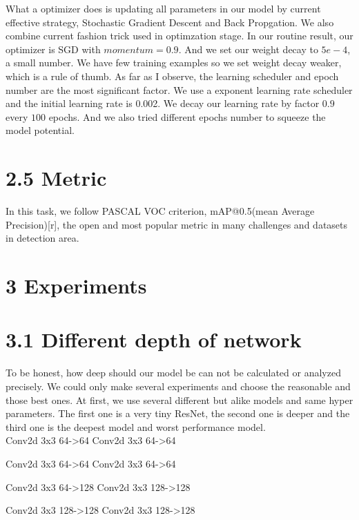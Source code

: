 \documentclass[12pt]{article}
\begin{document}
What a optimizer does is updating all parameters in our model by current effective strategy, Stochastic Gradient Descent and Back Propgation. We also combine current fashion trick used in optimzation stage. In our routine result, our optimizer is SGD with $momentum = 0.9$. And we set our weight decay to $5e-4$, a small number. We have few training examples so we set weight decay weaker, which is a rule of thumb. As far as I observe, the learning scheduler and epoch number are the most significant factor. We use a exponent learning rate scheduler and the initial learning rate is 0.002. We decay our learning rate by factor $0.9$ every $100$ epochs. And we also tried different epochs number to squeeze the model potential.\\


\section {2.5 Metric}

In this task, we follow PASCAL VOC criterion, mAP@0.5(mean Average Precision)[r], the open and most popular metric in many challenges and datasets in detection area. \\


\section {3 Experiments}

\section {3.1 Different depth of network}

To be honest, how deep should our model be can not be calculated or analyzed precisely. We could only make several experiments and choose the reasonable and those best ones. At first, we use several different but alike models and same hyper parameters. The first one is a very tiny ResNet, the second one is deeper and the third one is the deepest model and worst performance model.\\

Conv2d 3x3 64->64
Conv2d 3x3 64->64

Conv2d 3x3 64->64
Conv2d 3x3 64->64

Conv2d 3x3 64->128
Conv2d 3x3 128->128

Conv2d 3x3 128->128
Conv2d 3x3 128->128
\end{document}
